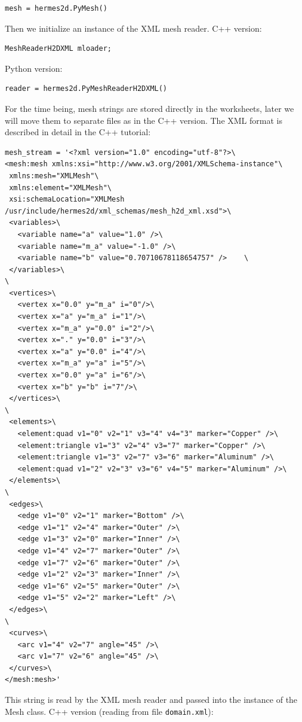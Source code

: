 \documentclass{article}
\begin{document}
{\small
\begin{verbatim}
mesh = hermes2d.PyMesh()
\end{verbatim}
}
\noindent
Then we initialize an instance of the XML mesh reader. C++ version:

{\small
\begin{verbatim}
MeshReaderH2DXML mloader;
\end{verbatim}
}
\noindent
Python version:

{\small
\begin{verbatim}
reader = hermes2d.PyMeshReaderH2DXML()
\end{verbatim}
}
\noindent
For the time being, mesh strings are stored directly in the 
worksheets, later we will move them to separate files as 
in the C++ version. The XML format is described in detail
in the C++ tutorial:

{\small
\begin{verbatim}
mesh_stream = '<?xml version="1.0" encoding="utf-8"?>\
<mesh:mesh xmlns:xsi="http://www.w3.org/2001/XMLSchema-instance"\
 xmlns:mesh="XMLMesh"\
 xmlns:element="XMLMesh"\
 xsi:schemaLocation="XMLMesh /usr/include/hermes2d/xml_schemas/mesh_h2d_xml.xsd">\
 <variables>\
   <variable name="a" value="1.0" />\
   <variable name="m_a" value="-1.0" />\
   <variable name="b" value="0.70710678118654757" />	\
 </variables>\
\
 <vertices>\
   <vertex x="0.0" y="m_a" i="0"/>\
   <vertex x="a" y="m_a" i="1"/>\
   <vertex x="m_a" y="0.0" i="2"/>\
   <vertex x="." y="0.0" i="3"/>\
   <vertex x="a" y="0.0" i="4"/>\
   <vertex x="m_a" y="a" i="5"/>\
   <vertex x="0.0" y="a" i="6"/>\
   <vertex x="b" y="b" i="7"/>\
 </vertices>\
\
 <elements>\
   <element:quad v1="0" v2="1" v3="4" v4="3" marker="Copper" />\
   <element:triangle v1="3" v2="4" v3="7" marker="Copper" />\
   <element:triangle v1="3" v2="7" v3="6" marker="Aluminum" />\
   <element:quad v1="2" v2="3" v3="6" v4="5" marker="Aluminum" />\
 </elements>\
\
 <edges>\
   <edge v1="0" v2="1" marker="Bottom" />\
   <edge v1="1" v2="4" marker="Outer" />\
   <edge v1="3" v2="0" marker="Inner" />\
   <edge v1="4" v2="7" marker="Outer" />\
   <edge v1="7" v2="6" marker="Outer" />\
   <edge v1="2" v2="3" marker="Inner" />\
   <edge v1="6" v2="5" marker="Outer" />\
   <edge v1="5" v2="2" marker="Left" />\
 </edges>\
\
 <curves>\
   <arc v1="4" v2="7" angle="45" />\
   <arc v1="7" v2="6" angle="45" />\
 </curves>\
</mesh:mesh>'
\end{verbatim}
}
\noindent
This string is read by the XML mesh reader and passed into 
the instance of the Mesh class. C++ version (reading from 
file {\tt domain.xml}):
\end{document}
